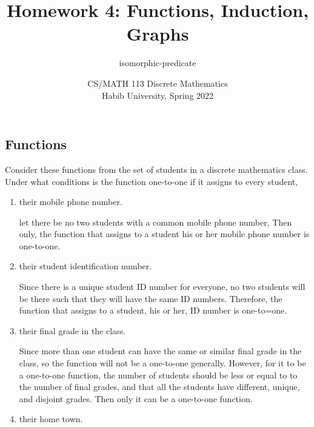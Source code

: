 \documentclass[addpoints]{exam}
\title{Homework 4: Functions, Induction, Graphs}
\author{isomorphic-predicate}  %
\date{CS/MATH 113 Discrete Mathematics\\Habib University, Spring 2022}
\begin{document}
\maketitle

\begin{questions}

  \section*{Functions}
  
\question[5] Consider these functions from the set of students in a discrete mathematics class. Under what conditions is the
  function one-to-one if it assigns to every student,
  
  \begin{enumerate}[label=\alph*)]
  \item their mobile phone number.
    \begin{solution}
      let there be no two students with a common mobile phone number, 
      \newline Then only, the function that assigns to a student his or her mobile phone number is one-to-one.
    \end{solution}
  \item their student identification number.
    \begin{solution}
      Since there is a unique student ID number for everyone, no two students will be there 
      \newline such that they will have the same ID numbers. Therefore, the function that assigns
      \newline to a student, his or her, ID number is one-to=one. 
    \end{solution}
  \item their final grade in the class.
    \begin{solution}
      Since more than one student can have the same or similar final grade in the class, so the function will not be a one-to-one
      \newline generally. 
      \newline However, for it to be a one-to-one function, the number of students should be less or equal to 
      \newline to the number of final grades, and that all the students have different, unique, and disjoint grades. 
      \newline Then only it can be a one-to-one function. 
    \end{solution}
  \item their home town.

\end{enumerate}
\end{questions}
\end{document}
